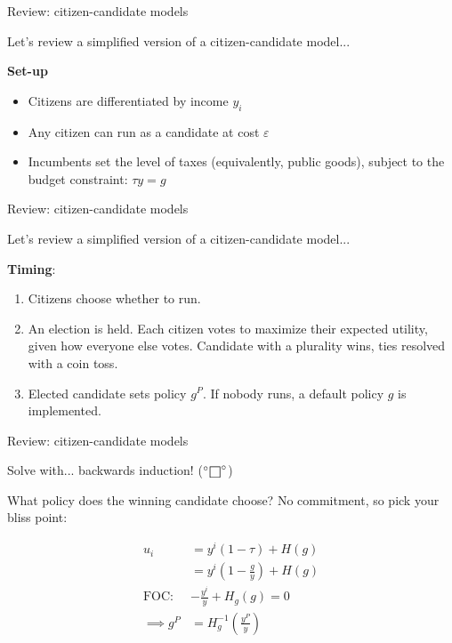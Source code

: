 \documentclass[11pt,aspectratio=169]{beamer}
\def\msquare{\mathord{\scalerel*{\Box}{gX}}}
\begin{document}
 \begin{frame}{Review: citizen-candidate models}
 
 Let's review a simplified version of a citizen-candidate model...
 
 \pause

 \textbf{Set-up}
 
 \begin{itemize}
 \item Citizens are differentiated by income $y_i$
 \item Any citizen can run as a candidate at cost $\varepsilon$
 \item Incumbents set the level of taxes (equivalently, public goods), subject to the budget constraint: $\tau y = g$
 \end{itemize}
 
 \end{frame}
 
 \begin{frame}{Review: citizen-candidate models}
 
 Let's review a simplified version of a citizen-candidate model...
 
 \textbf{Timing}:
 
 \begin{enumerate}
 \item Citizens choose whether to run.
 \item An election is held. Each citizen votes to maximize their expected utility, given how everyone else votes. Candidate with a plurality wins, ties resolved with a coin toss.
 \item Elected candidate sets policy $g^P$. If nobody runs, a default policy $g$ is implemented.
 \end{enumerate}
 
 
 \end{frame}
 
 \begin{frame}{Review: citizen-candidate models}
 
 Solve with... \pause backwards induction! ($^{\circ} \msquare ^{\circ}$)
 
 \pause
 
What policy does the winning candidate choose? \pause No commitment, so pick your bliss point:

\vspace{-1em}

\begin{align*}
u_i &= y^i (1 - \tau) + H(g) \\
&= y^i \left( 1 - \frac{g}{y} \right) + H(g) \\
\operatorname{FOC:}  & -\frac{y^i}{y} + H_g(g) = 0 \\
\implies g^P &= H_g^{-1} \left( \frac{y^P}{y} \right)
\end{align*}
 
 \end{frame}
 
\end{document}
